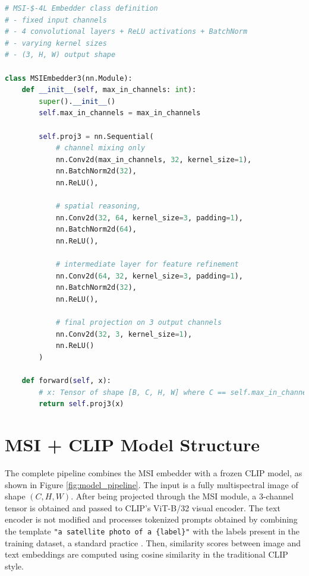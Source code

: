 \documentclass[a4paper, twoside, english]{sapthesis} %
\begin{document}
\begin{lstlisting}[language=Python, caption={MSI-T-4L Embedder structure in PyTorch code.}]
# MSI-$-4L Embedder class definition
# - fixed input channels
# - 4 convolutional layers + ReLU activations + BatchNorm
# - varying kernel sizes
# - (3, H, W) output shape

class MSIEmbedder3(nn.Module):
    def __init__(self, max_in_channels: int):
        super().__init__()
        self.max_in_channels = max_in_channels

        self.proj3 = nn.Sequential(
            # channel mixing only
            nn.Conv2d(max_in_channels, 32, kernel_size=1),  
            nn.BatchNorm2d(32),
            nn.ReLU(),
            
            # spatial reasoning,
            nn.Conv2d(32, 64, kernel_size=3, padding=1),
            nn.BatchNorm2d(64),
            nn.ReLU(),
            
            # intermediate layer for feature refinement
            nn.Conv2d(64, 32, kernel_size=3, padding=1), 
            nn.BatchNorm2d(32),
            nn.ReLU(),

            # final projection on 3 output channels
            nn.Conv2d(32, 3, kernel_size=1),                
            nn.ReLU()
        )

    def forward(self, x):
        # x: Tensor of shape [B, C, H, W] where C == self.max_in_channels
        return self.proj3(x)
\end{lstlisting}


\section{MSI + CLIP Model Structure}

The complete pipeline combines the MSI embedder with a frozen CLIP model, as shown in Figure \ref{fig:model_pipeline}. The input is a fully multispectral image of shape $(C, H, W)$. After being projected through the MSI module, a 3-channel tensor is obtained and passed to CLIP’s ViT-B/32 visual encoder. The text encoder is not modified and processes tokenized prompts obtained by combining the template \texttt{"a satellite photo of a \{label\}"} with the labels present in the training dataset, a standard practice \cite{radford2021learning} \cite{liu2024remoteclip} \cite{zhang2024rs5m}. Then, similarity scores between image and text embeddings are computed using cosine similarity in the traditional CLIP style.
\end{document}

